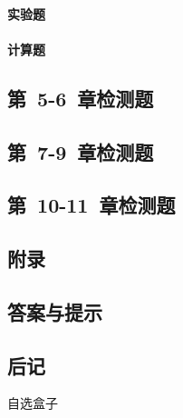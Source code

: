 \documentclass[color=purple,openany]{textbook-cn}
\begin{document}
\begin{Test}
\begin{multicols}{2}
\subsection{实验题}

\zhlipsum[3]

\subsection{计算题}

\zhlipsum[4-6]

\end{multicols}


\chapter{第~5-6~章检测题}



\chapter{第~7-9~章检测题}


\chapter{第~10-11~章检测题}


\end{Test}



\tcbstoprecording




\begin{Appendix}

\part*{附录}


\chapter{答案与提示}
\tcbinputrecords


\end{Appendix}




\printindex[noun]

\printindex[video]






\lipsum


\backmatter


\chapter*{后记}
\lipsum
\lipsum



\begin{box6}{自选盒子}
\lipsum[2]
\end{box6}
















\makespine[1.0cm]
\end{document}
